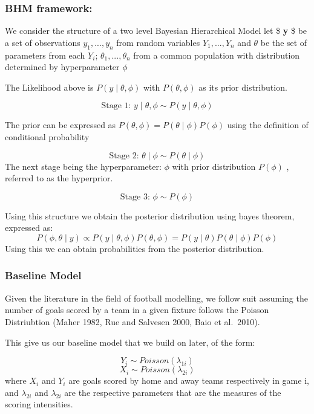 \documentclass[
]{article}
\begin{document}
\hypertarget{bhm-framework}{%
\subsubsection{BHM framework:}\label{bhm-framework}}

We consider the structure of a two level Bayesian Hierarchical Model let
\$ \textbf{y} \$ be a set of observations \(y_1,...,y_n\) from random
variables \(Y_1,...,Y_n\) and \(\theta\) be the set of parameters from
each \(Y_i\); \(\theta_1,...,\theta_n\) from a common population with
distribution determined by hyperparameter \(\phi\)

The Likelihood above is \(P(y\mid\theta,\phi)\) with \(P(\theta,\phi)\)
as its prior distribution.

\[\text{Stage 1: }y\mid\theta,\phi \sim P(y\mid\theta,\phi)\]

The prior can be expressed as
\(P(\theta,\phi) = P(\theta\mid\phi)P(\phi)\) using the definition of
conditional probability

\[\text{Stage 2: }\theta\mid\phi \sim P(\theta\mid\phi)\] The next stage
being the hyperparameter: \(\phi\) with prior distribution \(P(\phi)\) ,
referred to as the hyperprior.

\[\text{Stage 3: } \phi \sim P(\phi)\]

Using this structure we obtain the posterior distribution using bayes
theorem, expressed as:
\[P(\phi,\theta\mid y)  \propto P(y \mid\theta,\phi) P(\theta,\phi) = P(y\mid\theta ) P(\theta \mid\phi ) P(\phi)\]
Using this we can obtain probabilities from the posterior distribution.

\hypertarget{baseline-model}{%
\subsubsection{Baseline Model}\label{baseline-model}}

Given the literature in the field of football modelling, we follow suit
assuming the number of goals scored by a team in a given fixture follows
the Poisson Distriubtion (Maher 1982, Rue and Salvesen 2000, Baio et
al.~2010).

This give us our baseline model that we build on later, of the form:

\[Y_i \sim Poisson(\lambda_{1i}) \] \[X_i \sim Poisson(\lambda_{2i}) \]
where \(X_i\) and \(Y_i\) are goals scored by home and away teams
respectively in game i, and \(\lambda_{2i}\) and \(\lambda_{2i}\) are
the respective parameters that are the measures of the scoring
intensities.
\end{document}
